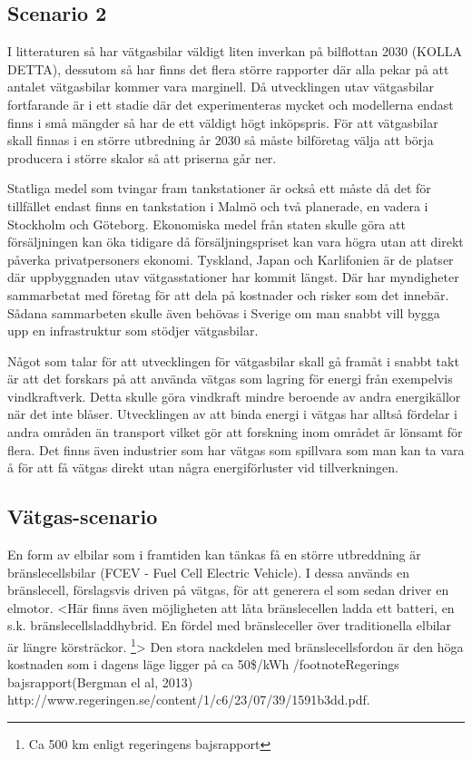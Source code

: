 \documentclass[a4paper,11pt,fleqn, titlepage]{article}
\begin{document}
\subsection{Scenario 2}
I litteraturen så har vätgasbilar väldigt liten inverkan på bilflottan 2030 (KOLLA DETTA), dessutom så har finns det flera större rapporter där alla pekar på att antalet vätgasbilar kommer vara marginell.
Då utvecklingen utav vätgasbilar fortfarande är i ett stadie där det experimenteras mycket och modellerna endast finns i små mängder så har de ett väldigt högt inköpspris. För att vätgasbilar skall finnas i en större utbredning år 2030 så måste bilföretag välja att börja producera i större skalor så att priserna går ner.

Statliga medel som tvingar fram tankstationer är också ett måste då det för tillfället endast finns en tankstation i Malmö och två planerade, en vadera i Stockholm och Göteborg.
Ekonomiska medel från staten skulle göra att försäljningen kan öka tidigare då försäljningspriset kan vara högra utan att direkt påverka privatpersoners ekonomi.
Tyskland, Japan och Karlifonien är de platser där uppbyggnaden utav vätgasstationer har kommit längst. Där har myndigheter sammarbetat med företag för att dela på kostnader och risker som det innebär. Sådana sammarbeten skulle även behövas i Sverige om man snabbt vill bygga upp en infrastruktur som stödjer vätgasbilar.

Något som talar för att utvecklingen för vätgasbilar skall gå framåt i snabbt takt är att det forskars på att använda vätgas som lagring för energi från exempelvis vindkraftverk. Detta skulle göra vindkraft mindre beroende av andra energikällor när det inte blåser. Utvecklingen av att binda energi i vätgas har alltså fördelar i andra områden än transport vilket gör att forskning inom området är lönsamt för flera. Det finns även industrier som har vätgas som spillvara som man kan ta vara å för att få vätgas direkt utan några energiförluster vid tillverkningen.

\subsection{Vätgas-scenario}

En form av elbilar som i framtiden kan tänkas få en större utbreddning är bränslecellsbilar (FCEV - Fuel Cell Electric Vehicle). I dessa används en bränslecell, förslagsvis driven på vätgas, för att generera el som sedan driver en elmotor. <Här finns även möjligheten att låta bränslecellen ladda ett batteri, en s.k. bränslecellsladdhybrid. En fördel med bränsleceller över traditionella elbilar är längre körsträckor. \footnote{Ca 500 km enligt regeringens bajsrapport}> Den stora nackdelen med bränslecellsfordon är den höga kostnaden som i dagens läge ligger på ca 50\$/kWh /footnote{Regerings bajsrapport(Bergman el al, 2013) http://www.regeringen.se/content/1/c6/23/07/39/1591b3dd.pdf}.
\end{document}
